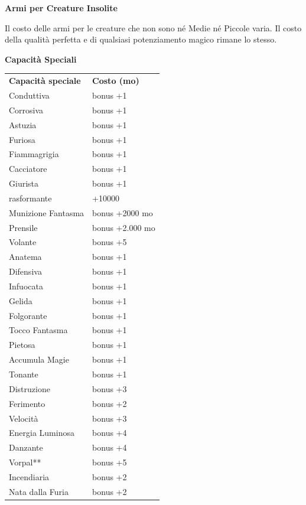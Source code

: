 \documentclass[a4paper,11pt,twoside,openany]{book}
\begin{document}
\textbf{Armi per Creature Insolite}

Il costo delle armi per le creature che non sono né Medie né Piccole varia. Il costo della qualità perfetta e di qualsiasi potenziamento
magico rimane lo stesso.

\bigskip

\textbf{Capacità Speciali}

\bigskip

\begin{tabular}{ll}
	\toprule
	\textbf{Capacità speciale}    & \textbf{Costo (mo)}\\
	Conduttiva \index{Conduttiva} & bonus +1\\
	Corrosiva\index{Corrosiva}    & bonus +1\\
	Astuzia \index{Astuzia}       & bonus +1\\
	Furiosa \index{Furiosa}       & bonus +1\\
	Fiammagrigia \index{Fiammagrigia}             & bonus +1\\
	Cacciatore \index{Cacciatore} & bonus +1\\
	Giurista \index{Giurista}     & bonus +1\\
	rasformante \index{Trasformante}              & +10000\\
	Munizione Fantasma \index{Munizione Fantasma} & bonus +2000 mo\\
	Prensile \index{Prensile}     & bonus +2.000 mo\\
	Volante \index{Volante}       & bonus +5\\
	Anatema\index{Anatema}        & bonus +1\\
	Difensiva\index{Difensiva}    & bonus +1\\
	Infuocata \index{Infuocata}   & bonus +1\\
	Gelida \index{Gelida}         & bonus +1\\
	Folgorante \index{Folgorante} & bonus +1\\
	Tocco Fantasma \index{Tocco Fantasma}         & bonus +1\\
	Pietosa \index{Pietosa}       & bonus +1\\
	Accumula Magie \index{Accumula Magie}         & bonus +1\\
	Tonante \index{Tonante}       & bonus +1\\
	Distruzione \index{Distruzione}               & bonus +3\\
	Ferimento \index{Ferimento}   & bonus +2\\
	Velocità \index{Velocita'}    & bonus +3\\
	Energia Luminosa \index{Energia Luminosa}     & bonus +4\\
	Danzante \index{Danzante}     & bonus +4\\
	Vorpal** \index{Vorpal}       & bonus +5\\
	Incendiaria \index{Incendiaria}               & bonus +2\\
	Nata dalla Furia \index{Nata dalla Furia}     & bonus +2\\
\end{tabular}
\end{document}

